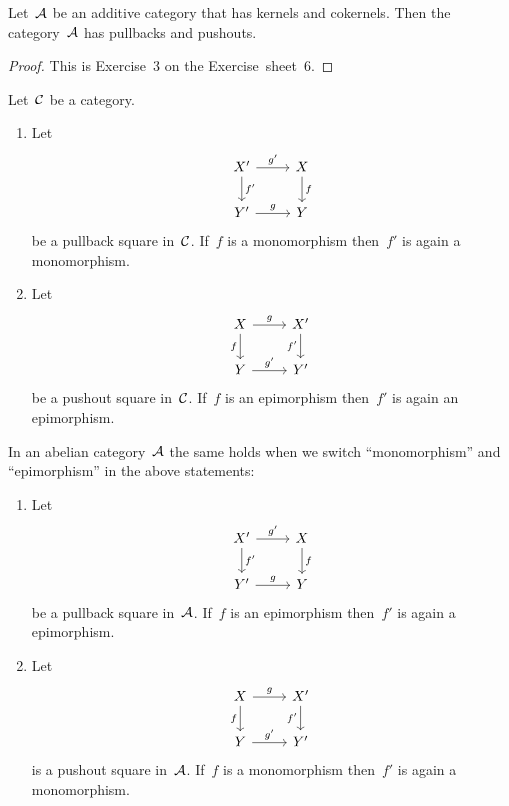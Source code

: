 \begin{lemma*}
  Let~$\mathcal{A}$ be an additive category that has kernels and cokernels.
  Then the category~$\mathcal{A}$ has pullbacks and pushouts.
\end{lemma*}


\begin{proof}
  This is Exercise~3 on the Exercise~sheet~6.
\end{proof}


\begin{proposition*}
  \label{mono epi under pull push}
  Let~$\mathcal{C}$ be a category.
  \begin{enumerate}
    \item
      \label{pullback of mono}
      Let
      \[
        \begin{tikzcd}
            X'
            \arrow{r}[above]{g'}
            \arrow{d}[right]{f'}
          & X
            \arrow{d}[right]{f}
          \\
            Y'
            \arrow{r}[above]{g}
          & Y
        \end{tikzcd}
      \]
      be a pullback square in~$\mathcal{C}$.
      If~$f$ is a monomorphism then~$f'$ is again a monomorphism.
    \item
      Let
      \[
        \begin{tikzcd}
            X
            \arrow{r}[above]{g}
            \arrow{d}[left]{f}
          & X'
            \arrow{d}[left]{f'}
          \\
            Y
            \arrow{r}[above]{g'}
          & Y'
        \end{tikzcd}
      \]
      be a pushout square in~$\mathcal{C}$.
      If~$f$ is an epimorphism then~$f'$ is again an epimorphism.
  \end{enumerate}
  In an abelian category~$\mathcal{A}$ the same holds when we switch \enquote{monomorphism} and \enquote{epimorphism} in the above statements:
  \begin{enumerate}[resume]
    \item
      \label{pullback of epi}
      Let
      \[
        \begin{tikzcd}
            X'
            \arrow{r}[above]{g'}
            \arrow{d}[right]{f'}
          & X
            \arrow{d}[right]{f}
          \\
            Y'
            \arrow{r}[above]{g}
          & Y
        \end{tikzcd}
      \]
      be a pullback square in~$\mathcal{A}$.
      If~$f$ is an epimorphism then~$f'$ is again a epimorphism.
    \item
      \label{pushout of mono}
      Let
      \[
        \begin{tikzcd}
            X
            \arrow{r}[above]{g}
            \arrow{d}[left]{f}
          & X'
            \arrow{d}[left]{f'}
          \\
            Y
            \arrow{r}[above]{g'}
          & Y'
        \end{tikzcd}
      \]
      is a pushout square in~$\mathcal{A}$.
      If~$f$ is a monomorphism then~$f'$ is again a monomorphism.
  \end{enumerate}
\end{proposition*}


